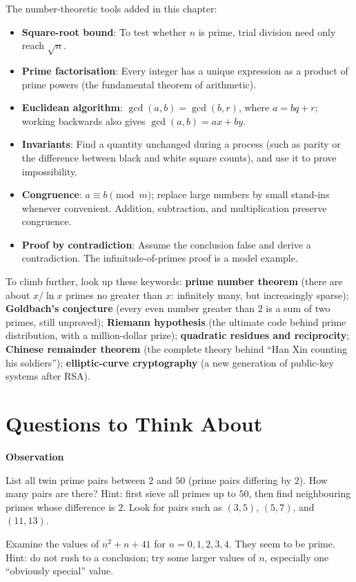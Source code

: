 \begin{toolbox}
The number-theoretic tools added in this chapter:
\begin{itemize}
  \item \textbf{Square-root bound}: To test whether $n$ is prime, trial division need only reach $\sqrt{n}$.
  \item \textbf{Prime factorisation}: Every integer has a unique expression as a product of prime powers (the fundamental theorem of arithmetic).
  \item \textbf{Euclidean algorithm}: $\gcd(a,b)=\gcd(b,r)$, where $a=bq+r$; working backwards also gives $\gcd(a,b)=ax+by$.
  \item \textbf{Invariants}: Find a quantity unchanged during a process (such as parity or the difference between black and white square counts), and use it to prove impossibility.
  \item \textbf{Congruence}: $a\equiv b\pmod{m}$; replace large numbers by small stand-ins whenever convenient. Addition, subtraction, and multiplication preserve congruence.
  \item \textbf{Proof by contradiction}: Assume the conclusion false and derive a contradiction. The infinitude-of-primes proof is a model example.
\end{itemize}
\end{toolbox}

\begin{pandeng}
To climb further, look up these keywords: \textbf{prime number theorem} (there are about $x/\ln x$ primes no greater than $x$: infinitely many, but increasingly sparse); \textbf{Goldbach's conjecture} (every even number greater than $2$ is a sum of two primes, still unproved); \textbf{Riemann hypothesis} (the ultimate code behind prime distribution, with a million-dollar prize); \textbf{quadratic residues and reciprocity}; \textbf{Chinese remainder theorem} (the complete theory behind ``Han Xin counting his soldiers''); \textbf{elliptic-curve cryptography} (a new generation of public-key systems after RSA).
\end{pandeng}

\section*{Questions to Think About}

\textbf{Observation}
\begin{sikao}
  \item List all twin prime pairs between $2$ and $50$ (prime pairs differing by $2$). How many pairs are there? Hint: first sieve all primes up to $50$, then find neighbouring primes whose difference is $2$. Look for pairs such as $(3,5)$, $(5,7)$, and $(11,13)$.
  \item Examine the values of $n^2+n+41$ for $n=0,1,2,3,4$. They seem to be prime. Hint: do not rush to a conclusion; try some larger values of $n$, especially one ``obviously special'' value.
\end{sikao}

